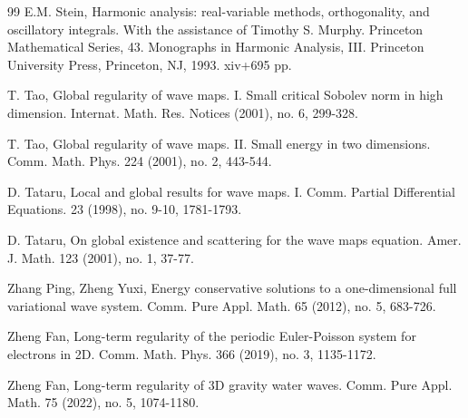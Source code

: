\documentclass[11pt,twoside]{article}
\theoremstyle{plain}
\theoremstyle{definition}
\numberwithin{equation}{section}
\begin{document}
\begin{thebibliography}{99}
 E.M. Stein, Harmonic analysis: real-variable methods, orthogonality, and oscillatory integrals.
With the assistance of Timothy S. Murphy. Princeton Mathematical Series, 43. Monographs in Harmonic Analysis, III.
Princeton University Press, Princeton, NJ, 1993. xiv+695 pp.



T. Tao, Global regularity of wave maps. I. Small critical Sobolev norm in high dimension.
Internat. Math. Res. Notices (2001), no. 6, 299-328.


T. Tao,  Global regularity of wave maps. II. Small energy in two dimensions. Comm. Math. Phys. 224 (2001), no. 2, 443-544.

D. Tataru, Local and global results for wave maps. I. Comm. Partial Differential Equations. 23 (1998), no. 9-10, 1781-1793.


D. Tataru, On global existence and scattering for the wave maps equation. Amer. J. Math. 123 (2001), no. 1, 37-77.


 Zhang Ping, Zheng Yuxi, Energy conservative solutions to a one-dimensional full variational
wave system. Comm. Pure Appl. Math. 65 (2012), no. 5, 683-726.


 Zheng Fan, Long-term regularity of the periodic Euler-Poisson system for electrons in 2D.
Comm. Math. Phys. 366 (2019), no. 3, 1135-1172.

 Zheng Fan, Long-term regularity of 3D gravity water waves. Comm. Pure Appl. Math. 75 (2022), no. 5, 1074-1180.


\end{thebibliography}
\end{document}
